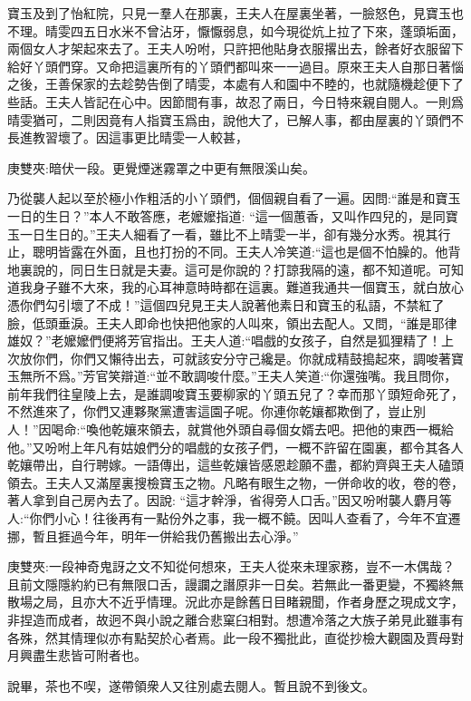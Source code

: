 \begin{parag}
    寶玉及到了怡紅院，只見一羣人在那裏，王夫人在屋裏坐著，一臉怒色，見寶玉也不理。晴雯四五日水米不曾沾牙，懨懨弱息，如今現從炕上拉了下來，蓬頭垢面，兩個女人才架起來去了。王夫人吩咐，只許把他貼身衣服撂出去，餘者好衣服留下給好丫頭們穿。又命把這裏所有的丫頭們都叫來一一過目。原來王夫人自那日著惱之後，王善保家的去趁勢告倒了晴雯，本處有人和園中不睦的，也就隨機趁便下了些話。王夫人皆記在心中。因節間有事，故忍了兩日，今日特來親自閱人。一則爲晴雯猶可，二則因竟有人指寶玉爲由，說他大了，已解人事，都由屋裏的丫頭們不長進教習壞了。因這事更比晴雯一人較甚，\begin{note}庚雙夾:暗伏一段。更覺煙迷霧罩之中更有無限溪山矣。\end{note}乃從襲人起以至於極小作粗活的小丫頭們，個個親自看了一遍。因問:“誰是和寶玉一日的生日？”本人不敢答應，老嬤嬤指道: “這一個蕙香，又叫作四兒的，是同寶玉一日生日的。”王夫人細看了一看，雖比不上晴雯一半，卻有幾分水秀。視其行止，聰明皆露在外面，且也打扮的不同。王夫人冷笑道:“這也是個不怕臊的。他背地裏說的，同日生日就是夫妻。這可是你說的？打諒我隔的遠，都不知道呢。可知道我身子雖不大來，我的心耳神意時時都在這裏。難道我通共一個寶玉，就白放心憑你們勾引壞了不成！”這個四兒見王夫人說著他素日和寶玉的私語，不禁紅了臉，低頭垂淚。王夫人即命也快把他家的人叫來，領出去配人。又問，“誰是耶律雄奴？”老嬤嬤們便將芳官指出。王夫人道:“唱戲的女孩子，自然是狐狸精了！上次放你們，你們又懶待出去，可就該安分守己纔是。你就成精鼓搗起來，調唆著寶玉無所不爲。”芳官笑辯道:“並不敢調唆什麼。”王夫人笑道:“你還強嘴。我且問你，前年我們往皇陵上去，是誰調唆寶玉要柳家的丫頭五兒了？幸而那丫頭短命死了，不然進來了，你們又連夥聚黨遭害這園子呢。你連你乾孃都欺倒了，豈止別人！”因喝命:“喚他乾孃來領去，就賞他外頭自尋個女婿去吧。把他的東西一概給他。”又吩咐上年凡有姑娘們分的唱戲的女孩子們，一概不許留在園裏，都令其各人乾孃帶出，自行聘嫁。一語傳出，這些乾孃皆感恩趁願不盡，都約齊與王夫人磕頭領去。王夫人又滿屋裏搜檢寶玉之物。凡略有眼生之物，一併命收的收，卷的卷，著人拿到自己房內去了。因說: “這才幹淨，省得旁人口舌。”因又吩咐襲人麝月等人:“你們小心！往後再有一點份外之事，我一概不饒。因叫人查看了，今年不宜遷挪，暫且捱過今年，明年一併給我仍舊搬出去心淨。”\begin{note}庚雙夾:一段神奇鬼訝之文不知從何想來，王夫人從來未理家務，豈不一木偶哉？且前文隱隱約約已有無限口舌，謾讕之譖原非一日矣。若無此一番更變，不獨終無散場之局，且亦大不近乎情理。況此亦是餘舊日目睹親聞，作者身歷之現成文字，非捏造而成者，故迥不與小說之離合悲窠臼相對。想遭冷落之大族子弟見此雖事有各殊，然其情理似亦有點契於心者焉。此一段不獨批此，直從抄檢大觀園及賈母對月興盡生悲皆可附者也。\end{note}說畢，茶也不喫，遂帶領衆人又往別處去閱人。暫且說不到後文。
\end{parag}


